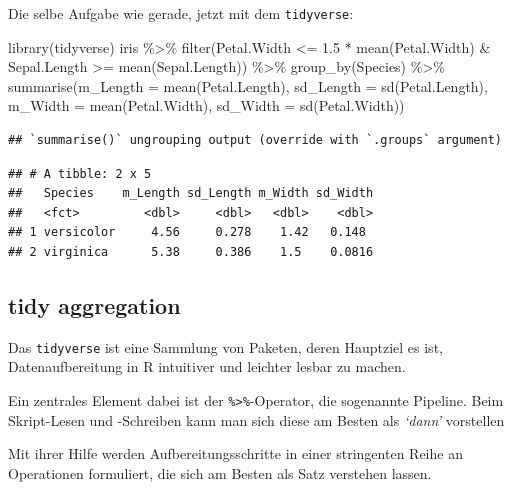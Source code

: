 \documentclass[
]{book}
\newenvironment{Shaded}{\begin{snugshade}}{\end{snugshade}}
\newcommand{\AttributeTok}[1]{\textcolor[rgb]{0.77,0.63,0.00}{#1}}
\newcommand{\FloatTok}[1]{\textcolor[rgb]{0.00,0.00,0.81}{#1}}
\newcommand{\FunctionTok}[1]{\textcolor[rgb]{0.00,0.00,0.00}{#1}}
\newcommand{\NormalTok}[1]{#1}
\newcommand{\SpecialCharTok}[1]{\textcolor[rgb]{0.00,0.00,0.00}{#1}}
\begin{document}
Die selbe Aufgabe wie gerade, jetzt mit dem \texttt{tidyverse}:

\begin{Shaded}
\begin{Highlighting}[]
\FunctionTok{library}\NormalTok{(tidyverse)}
\NormalTok{iris }\SpecialCharTok{\%\textgreater{}\%} 
  \FunctionTok{filter}\NormalTok{(Petal.Width }\SpecialCharTok{\textless{}=} \FloatTok{1.5} \SpecialCharTok{*} \FunctionTok{mean}\NormalTok{(Petal.Width) }\SpecialCharTok{\&}
\NormalTok{           Sepal.Length }\SpecialCharTok{\textgreater{}=} \FunctionTok{mean}\NormalTok{(Sepal.Length)) }\SpecialCharTok{\%\textgreater{}\%} 
  \FunctionTok{group\_by}\NormalTok{(Species) }\SpecialCharTok{\%\textgreater{}\%} 
  \FunctionTok{summarise}\NormalTok{(}\AttributeTok{m\_Length =} \FunctionTok{mean}\NormalTok{(Petal.Length),}
            \AttributeTok{sd\_Length =} \FunctionTok{sd}\NormalTok{(Petal.Length),}
            \AttributeTok{m\_Width =} \FunctionTok{mean}\NormalTok{(Petal.Width), }
            \AttributeTok{sd\_Width =} \FunctionTok{sd}\NormalTok{(Petal.Width))}
\end{Highlighting}
\end{Shaded}

\begin{verbatim}
## `summarise()` ungrouping output (override with `.groups` argument)
\end{verbatim}

\begin{verbatim}
## # A tibble: 2 x 5
##   Species    m_Length sd_Length m_Width sd_Width
##   <fct>         <dbl>     <dbl>   <dbl>    <dbl>
## 1 versicolor     4.56     0.278    1.42   0.148 
## 2 virginica      5.38     0.386    1.5    0.0816
\end{verbatim}

\hypertarget{tidy-aggregation}{%
\subsection{tidy aggregation}\label{tidy-aggregation}}

Das \texttt{tidyverse} ist eine Sammlung von Paketen, deren Hauptziel es ist, Datenaufbereitung in R intuitiver und leichter lesbar zu machen.

Ein zentrales Element dabei ist der \texttt{\%\textgreater{}\%}-Operator, die sogenannte Pipeline. Beim Skript-Lesen und -Schreiben kann man sich diese am Besten als \emph{`dann'} vorstellen

Mit ihrer Hilfe werden Aufbereitungsschritte in einer stringenten Reihe an Operationen formuliert, die sich am Besten als Satz verstehen lassen.
\end{document}
